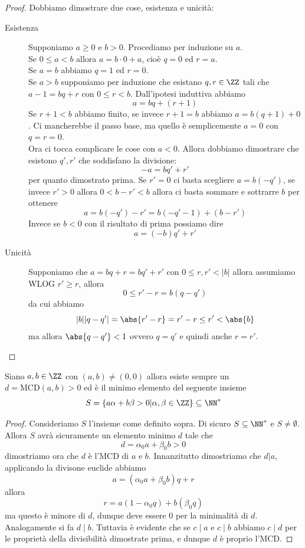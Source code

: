 \documentclass[11pt]{scrartcl}
\begin{document}
	\begin{proof}
		Dobbiamo dimostrare due cose, esistenza e unicità:
		\begin{description}
			\item[Esistenza] Supponiamo $a\ge 0$ e $b>0$. Procediamo per induzione su $a$. \\
			Se $0\le a < b$ allora $a=b\cdot 0+a$, cioè $q=0$ ed $r=a$.\\
			Se $a=b$ abbiamo $q=1$ ed $r=0$. \\
			Se $a>b$ supponiamo per induzione che esistano $q,r\in\ZZ$ tali che $a-1=bq+r$ con $0\le r<b$. Dall'ipotesi induttiva abbiamo 
			$$a=bq+(r+1)$$
			Se $r+1<b$ abbiamo finito, se invece $r+1=b$ abbiamo $a=b(q+1)+0$. Ci mancherebbe il passo base, ma quello è semplicemente $a=0$ con $q=r=0$. \\
			Ora ci tocca complicare le cose con $a<0$. Allora dobbiamo dimostrare che esistono $q',r'$ che soddisfano la divisione:
			$$-a=bq'+r'$$
			per quanto dimostrato prima. Se $r'=0$ ci basta scegliere $a=b(-q')$, se invece $r'>0$ allora $0<b-r'<b$ allora ci basta sommare e sottrarre $b$ per ottenere
			$$a=b(-q')-r'=b(-q'-1)+(b-r')$$
			Invece se $b<0$ con il risultato di prima possiamo dire
			$$a=(-b)q'+r'$$
			\item[Unicità] Supponiamo che $a=bq+r=bq'+r'$ con $0\le r,r'<|b|$ allora assumiamo WLOG $r'\ge r$, allora
			$$0\le r'-r=b(q-q')$$
			da cui abbiamo 
			$$|b||q-q'|=\abs{r'-r}= r'-r\le r'<\abs{b}$$
			ma allora $\abs{q-q'}<1$ ovvero $q=q'$ e quindi anche $r=r'$.
		\end{description}
	\end{proof}
	\begin{theorem}
		Siano $a,b\in\ZZ$ con $(a,b)\ne(0,0)$ allora esiste sempre un $d=\text{MCD}(a,b)>0$ ed è il minimo elemento del seguente insieme
		$$S=\left\{a\alpha+b\beta>0|\alpha,\beta\in\ZZ\right\}\subseteq \NN^*$$
	\end{theorem}
	\begin{proof}
		Consideriamo $S$ l'insieme come definito sopra. Di sicuro $S\subseteq\NN^*$ e $S\ne\emptyset$. Allora $S$ avrà sicuramente un elemento minimo $d$ tale che
		$$d=\alpha_0 a +\beta_0 b >0$$
		dimostriamo ora che $d$ è l'MCD di $a$ e $b$. Innanzitutto dimostriamo che $d|a$, applicando la divisone euclide abbiamo
		$$a=(\alpha_0 a + \beta_0 b)q+r$$
		allora 
		$$r=a(1-\alpha_0 q)+b(\beta_0 q)$$
		ma questo è minore di $d$, dunque deve essere $0$ per la minimalità di $d$. Analogamente si fa $d\mid b$. Tuttavia è evidente che se $c\mid a$ e $c\mid b$ abbiamo $c\mid d$ per le proprietà della divisibilità dimostrate prima, e dunque $d$ è proprio l'MCD. 
	\end{proof}
\end{document}
